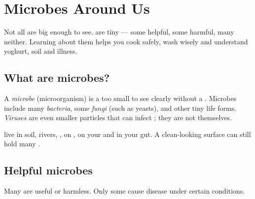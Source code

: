 \chapter{Microbes Around Us}\label{ch:g4:microbes}

Not all  are big enough to see.  are tiny
 --- some helpful, some harmful, many neither. Learning about
them helps you cook safely, wash wisely and understand yoghurt, soil
and illness.

\section{What are microbes?}

\begin{definition}[Microbe]\label{def:g4:microbes:def}
A \emph{microbe} (microorganism) is a  too
small to see clearly without a . Microbes include many
\emph{bacteria}, some \emph{fungi} (such as
yeasts), and other tiny life forms. \emph{Viruses} are even
smaller particles that can infect ; they are not  themselves.
\end{definition}


\begin{example}[Everywhere]\label{ex:g4:microbes:where}
 live in soil, rivers, , on  , on your 
and in your gut. A clean-looking surface can still hold many .
\end{example}

\section{Helpful microbes}

\begin{proposition}\label{prop:g4:microbes:helpful}
Many  are useful or harmless. Only some cause disease under
certain conditions.
\end{proposition}
\admitted

